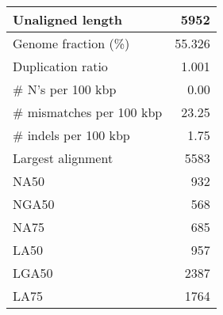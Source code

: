 \documentclass[12pt,a4paper]{article}
\begin{document}
\begin{table}[ht]
\begin{center}
\begin{tabular}{|l*{1}{|r}|}
Unaligned length & 5952 \\ \hline
Genome fraction (\%) & 55.326 \\ \hline
Duplication ratio & 1.001 \\ \hline
\# N's per 100 kbp & 0.00 \\ \hline
\# mismatches per 100 kbp & 23.25 \\ \hline
\# indels per 100 kbp & 1.75 \\ \hline
Largest alignment & 5583 \\ \hline
NA50 & 932 \\ \hline
NGA50 & 568 \\ \hline
NA75 & 685 \\ \hline
LA50 & 957 \\ \hline
LGA50 & 2387 \\ \hline
LA75 & 1764 \\ \hline
\end{tabular}
\end{center}
\end{table}
\end{document}
